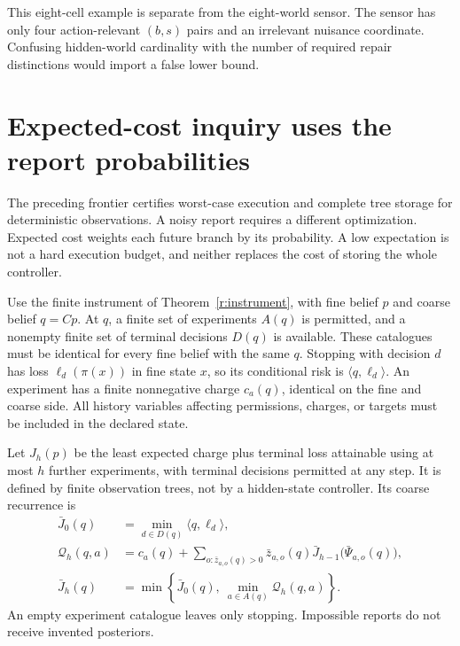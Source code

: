 \documentclass[11pt,oneside,openany]{book}
\theoremstyle{definition}\newtheorem{definition}[theorem]{Definition}
\begin{document}
This eight-cell example is separate from the eight-world sensor. The sensor has only four action-relevant $(b,s)$ pairs and an irrelevant nuisance coordinate. Confusing hidden-world cardinality with the number of required repair distinctions would import a false lower bound.


\section{Expected-cost inquiry uses the report probabilities}
The preceding frontier certifies worst-case execution and complete tree storage for deterministic observations. A noisy report requires a different optimization. Expected cost weights each future branch by its probability. A low expectation is not a hard execution budget, and neither replaces the cost of storing the whole controller.

Use the finite instrument of Theorem~\ref{r:instrument}, with fine belief $p$ and coarse belief $q=Cp$. At $q$, a finite set of experiments $A(q)$ is permitted, and a nonempty finite set of terminal decisions $D(q)$ is available. These catalogues must be identical for every fine belief with the same $q$. Stopping with decision $d$ has loss $\ell_d(\pi(x))$ in fine state $x$, so its conditional risk is $\langle q,\ell_d\rangle$. An experiment has a finite nonnegative charge $c_a(q)$, identical on the fine and coarse side. All history variables affecting permissions, charges, or targets must be included in the declared state.

Let $J_h(p)$ be the least expected charge plus terminal loss attainable using at most $h$ further experiments, with terminal decisions permitted at any step. It is defined by finite observation trees, not by a hidden-state controller. Its coarse recurrence is
\begin{align*}
 \bar J_0(q)&=\min_{d\in D(q)}\langle q,\ell_d\rangle,\\
 \mathcal Q_h(q,a)&=c_a(q)+\sum_{o:\bar z_{a,o}(q)>0}
       \bar z_{a,o}(q)\bar J_{h-1}\bigl(\bar\Psi_{a,o}(q)\bigr),\\
 \bar J_h(q)&=\min\left\{\bar J_0(q),\ \min_{a\in A(q)}\mathcal Q_h(q,a)\right\}.
\end{align*}
An empty experiment catalogue leaves only stopping. Impossible reports do not receive invented posteriors.
\end{document}
